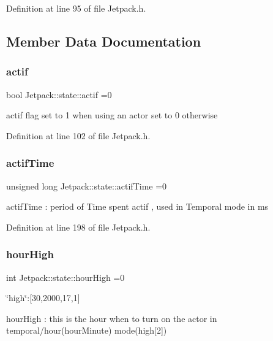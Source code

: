 Definition at line 95 of file Jetpack.\+h.



\subsection{Member Data Documentation}
\mbox{\label{struct_jetpack_1_1state_aa177541689bbaea21a4650a083b0df77}} 
\subsubsection{\texorpdfstring{actif}{actif}}
{\footnotesize\ttfamily bool Jetpack\+::state\+::actif =0}

actif flag set to 1 when using an actor set to 0 otherwise 

Definition at line 102 of file Jetpack.\+h.

\mbox{\label{struct_jetpack_1_1state_af2e1cc323ef9ffcc3cf4d203f85d726b}} 
\subsubsection{\texorpdfstring{actif\+Time}{actifTime}}
{\footnotesize\ttfamily unsigned long Jetpack\+::state\+::actif\+Time =0}

actif\+Time \+: period of Time spent actif , used in Temporal mode in ms 

Definition at line 198 of file Jetpack.\+h.

\mbox{\label{struct_jetpack_1_1state_ace824f4ae57fa1a4a27b2c6477b350e3}} 
\subsubsection{\texorpdfstring{hour\+High}{hourHigh}}
{\footnotesize\ttfamily int Jetpack\+::state\+::hour\+High =0}

\char`\"{}high\char`\"{}\+:\mbox{[}30,2000,17,1\mbox{]}

hour\+High \+: this is the hour when to turn on the actor in temporal/hour(hour\+Minute) mode(high\mbox{[}2\mbox{]}) 

